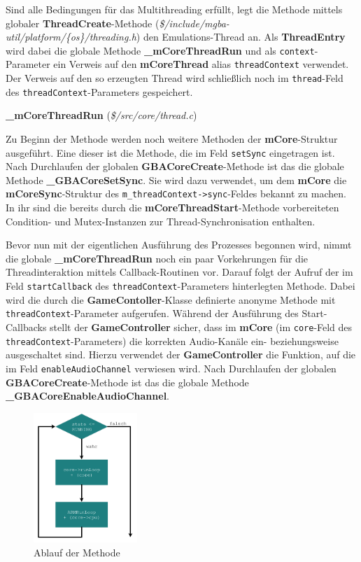 \documentclass[11pt,a4paper]{scrartcl}
\newcommand{\paratitlecode}[2] {
    \vspace{5mm}
    \large \textbf{#1} \normalsize(\textit{\${#2}})
    \vspace{2mm}\newline
}
\begin{document}
Sind alle Bedingungen f\"ur das Multithreading erf\"ullt, legt die Methode mittels globaler \textbf{ThreadCreate}-Methode (\textit{\$/include/mgba-util/platform/\{os\}/threading.h}) den Emulations-Thread an. Als \textbf{ThreadEntry} wird dabei die globale Methode \textbf{{\_}mCoreThreadRun} und als \verb|context|-Parameter ein Verweis auf den \textbf{mCoreThread} alias \verb|threadContext| verwendet. Der Verweis auf den so erzeugten Thread wird schlie{\ss}lich noch im \verb|thread|-Feld des \verb|threadContext|-Parameters gespeichert.

\paratitlecode{{\_}mCoreThreadRun}{/src/core/thread.c}
Zu Beginn der Methode werden noch weitere Methoden der \textbf{mCore}-Struktur ausgef\"uhrt. Eine dieser ist die Methode, die im Feld \verb|setSync| eingetragen ist. Nach Durchlaufen der globalen \textbf{GBACoreCreate}-Methode ist das die globale Methode \textbf{{\_}GBACoreSetSync}. Sie wird dazu verwendet, um dem \textbf{mCore} die \textbf{mCoreSync}-Struktur des \verb|m_threadContext->sync|-Feldes bekannt zu machen. In ihr sind die bereits durch die \textbf{mCoreThreadStart}-Methode vorbereiteten Condition- und Mutex-Instanzen zur Thread-Synchronisation enthalten.

Bevor nun mit der eigentlichen Ausf\"uhrung des Prozesses begonnen wird, nimmt die globale \textbf{{\_}mCoreThreadRun} noch ein paar Vorkehrungen f\"ur die Threadinteraktion mittels Callback-Routinen vor. Darauf folgt der Aufruf der im Feld \verb|startCallback| des \verb|threadContext|-Parameters hinterlegten Methode. Dabei wird die durch die \textbf{GameContoller}-Klasse definierte anonyme Methode mit \verb|threadContext|-Parameter aufgerufen. W\"ahrend der Ausf\"uhrung des Start-Callbacks stellt der \textbf{GameController} sicher, dass im \textbf{mCore} (im \verb|core|-Feld des \verb|threadContext|-Parameters) die korrekten Audio-Kan\"ale ein- beziehungsweise ausgeschaltet sind. Hierzu verwendet der \textbf{GameController} die Funktion, auf die im Feld \verb|enableAudioChannel| verwiesen wird. Nach Durchlaufen der globalen \textbf{GBACoreCreate}-Methode ist das die globale Methode \textbf{{\_}GBACoreEnableAudioChannel}.

\begin{figure}
    \centering
    \vspace{-7mm}
    \includegraphics[width=0.35\textwidth]{Emulator_RunLoop}
    \caption{Ablauf der Methode}
    \label{fig:runloop}
\end{figure}
\end{document}
